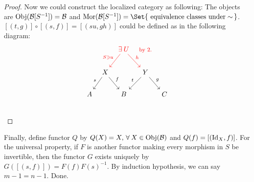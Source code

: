 \begin{theorem}
\begin{proof}
  Now we could construct the localized category as following:
  The objects are $\operatorname{Obj}(\mathcal{B}[S^{-1}]) = \mathcal{B}$ and
  $\Mor(\Bc[S^{-1}]) = \Set{ \text{ equivalence classes under} \sim \, }$.
  $[(t, g)] \circ [(s, f)] = [(su, gh)]$ could be defined as in the following
  diagram:
  \[ \begin{tikzcd}[column sep=tiny]
      & & {\color{red} \exists U}
      \ar[ld, "S \ni u"', red] \ar[rd, "h", red] & {\footnotesize \color{red} \text{by 2.}} & \\
      & X \ar[ld, "s"'] \ar[rd, "f"] & & Y \ar[ld, "t"'] \ar[rd, "g"] & \\
      A & & B & & C \\
    \end{tikzcd} \]
  \end{proof}

  Finally, define functor $Q$ by $Q(X) = X, \, \forall X \in \Obj(\Bc)$
  and $Q(f) = [({\rm Id}_X, f)]$. For the universal property, if $F$
  is another functor making every morphism in $S$ be invertible,
  then the functor $G$ exists uniquely by $G([(s, f)]) = F(f) F(s)^{-1}$.
  By induction hypothesis, we can say $m - 1 = n - 1$. Done.
\end{theorem}
